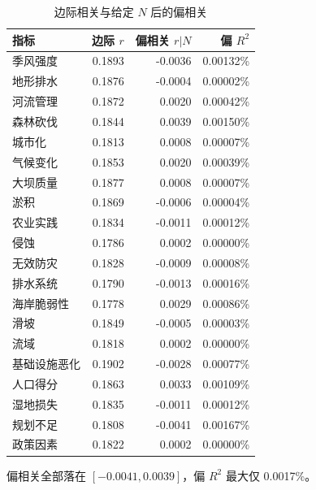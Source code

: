 \begin{table}[htbp]
\centering
\caption{边际相关与给定 $N$ 后的偏相关}
\label{tab:causal}
\small
\begin{tabular}{lrrr}
\toprule
指标 & 边际 $r$ & 偏相关 $r|N$ & 偏 $R^2$ \\
\midrule
季风强度 & 0.1893 & -0.0036 & 0.00132\% \\
地形排水 & 0.1876 & -0.0004 & 0.00002\% \\
河流管理 & 0.1872 & 0.0020 & 0.00042\% \\
森林砍伐 & 0.1844 & 0.0039 & 0.00150\% \\
城市化 & 0.1813 & 0.0008 & 0.00007\% \\
气候变化 & 0.1853 & 0.0020 & 0.00039\% \\
大坝质量 & 0.1877 & 0.0008 & 0.00007\% \\
淤积 & 0.1869 & -0.0006 & 0.00004\% \\
农业实践 & 0.1834 & -0.0011 & 0.00012\% \\
侵蚀 & 0.1786 & 0.0002 & 0.00000\% \\
无效防灾 & 0.1828 & -0.0009 & 0.00008\% \\
排水系统 & 0.1790 & -0.0013 & 0.00016\% \\
海岸脆弱性 & 0.1778 & 0.0029 & 0.00086\% \\
滑坡 & 0.1849 & -0.0005 & 0.00003\% \\
流域 & 0.1818 & 0.0002 & 0.00000\% \\
基础设施恶化 & 0.1902 & -0.0028 & 0.00077\% \\
人口得分 & 0.1863 & 0.0033 & 0.00109\% \\
湿地损失 & 0.1835 & -0.0011 & 0.00012\% \\
规划不足 & 0.1808 & -0.0041 & 0.00167\% \\
政策因素 & 0.1822 & 0.0002 & 0.00000\% \\
\bottomrule
\end{tabular}
\par\vspace{2pt}\footnotesize 偏相关全部落在 $[-0.0041,0.0039]$，偏 $R^2$ 最大仅 0.0017\%。
\end{table}
